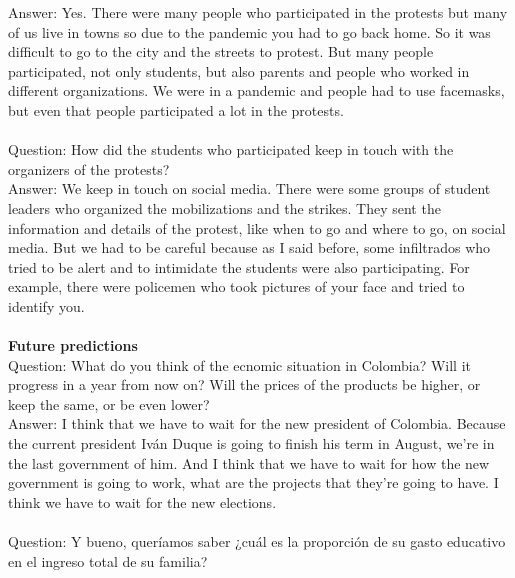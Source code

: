 \documentclass{phyasgn}\usepackage{nag}
\begin{document}
Answer: Yes. There were many people who participated in the protests but many of us live in towns so due to the pandemic you had to go back home. So it was difficult to go to the city and the streets to protest. But many people participated, not only students, but also parents and people who worked in different organizations. We were in a pandemic and people had to use facemasks, but even that people participated a lot in the protests. \\
\\
Question: How did the students who participated keep in touch with the organizers of the protests?\\
Answer: We keep in touch on social media. There were some groups of student leaders who organized the mobilizations and the strikes. They sent the information and details of the protest, like when to go and where to go, on social media. But we had to be careful because as I said before, some infiltrados who tried to be alert and to intimidate the students were also participating. For example, there were policemen who took pictures of your face and tried to identify you. \\
\\
\textbf{Future predictions}\\
Question: What do you think of the ecnomic situation in Colombia? Will it progress in a year from now on? Will the prices of the products be higher, or keep the same, or be even lower?\\
Answer: I think that we have to wait for the new president of Colombia. Because the current president Iván Duque is going to finish his term in August, we’re in the last government of him. And I think that we have to wait for how the new government is going to work, what are the projects that they’re going to have. I think we have to wait for the new elections.\\
\\
Question: Y bueno, queríamos saber ¿cuál es la proporción de su gasto educativo en el ingreso total de su familia?\\
\end{document}
